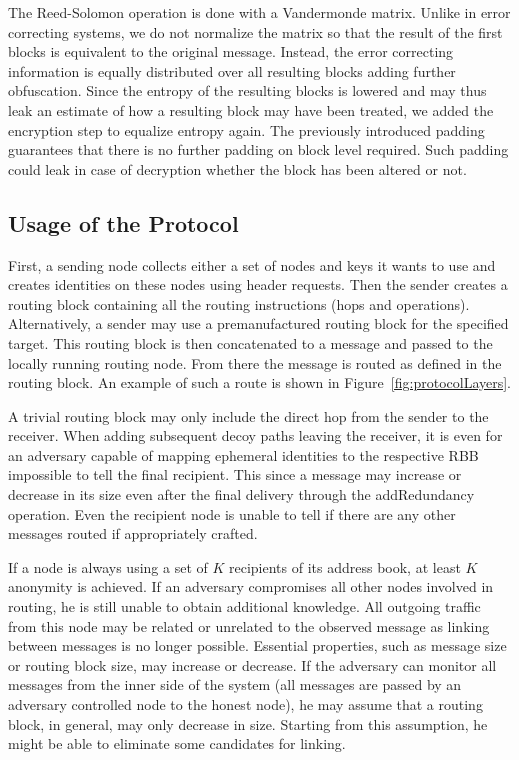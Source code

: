 \documentclass[10pt,journal,compsoc,twocolumn,twoside]{IEEEtran}
\begin{document}
The Reed-Solomon operation is done with a Vandermonde matrix. Unlike in error correcting systems, we do not normalize the matrix so that the result of the first blocks is equivalent to the original message. Instead, the error correcting information is equally distributed over all resulting blocks adding further obfuscation. Since the entropy of the resulting blocks is lowered and may thus leak an estimate of how a resulting block may have been treated, we added the encryption step to equalize entropy again. The previously introduced padding guarantees that there is no further padding on block level required. Such padding could leak in case of decryption whether the block has been altered or not.

\subsection{Usage of the Protocol}
First, a sending node collects either a set of nodes and keys it wants to use and creates identities on these nodes using header requests. Then the sender creates a routing block containing all the routing instructions (hops and operations). Alternatively, a sender may use a premanufactured routing block for the specified target. This routing block is then concatenated to a message and passed to the locally running routing node. From there the message is routed as defined in the routing block. An example of such a route is shown in Figure~\ref{fig:protocolLayers}.

A trivial routing block may only include the direct hop from the sender to the receiver. When adding subsequent decoy paths leaving the receiver, it is even for an adversary capable of mapping ephemeral identities to the respective RBB impossible to tell the final recipient. This since a message may increase or decrease in its size even after the final delivery through the addRedundancy operation. Even the recipient node is unable to tell if there are any other messages routed if appropriately crafted.

If a node is always using a set of $K$ recipients of its address book, at least $K$ anonymity is achieved. If an adversary compromises all other nodes involved in routing, he is still unable to obtain additional knowledge. All outgoing traffic from this node may be related or unrelated to the observed message as linking between messages is no longer possible. Essential properties, such as message size or routing block size, may increase or decrease. If the adversary can monitor all messages from the inner side of the system (all messages are passed by an adversary controlled node to the honest node), he may assume that a routing block, in general, may only decrease in size. Starting from this assumption, he might be able to eliminate some candidates for linking.
\end{document}
